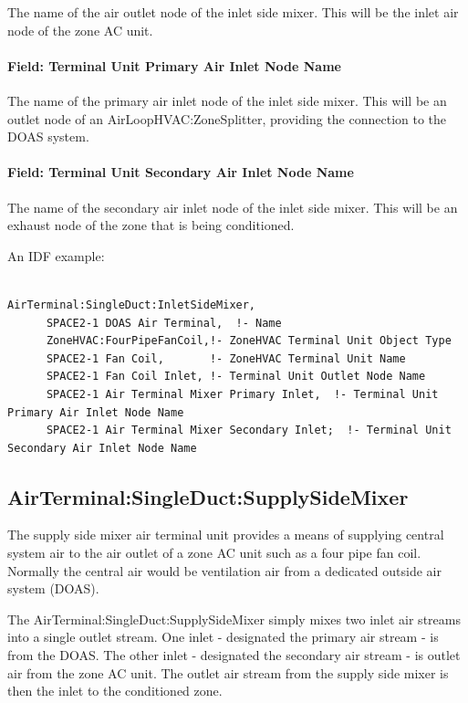 The name of the air outlet node of the inlet side mixer. This will be the inlet air node of the zone AC unit.

\paragraph{Field: Terminal Unit Primary Air Inlet Node Name}\label{field-terminal-unit-primary-air-inlet-node-name}

The name of the primary air inlet node of the inlet side mixer. This will be an outlet node of an AirLoopHVAC:ZoneSplitter, providing the connection to the DOAS system.

\paragraph{Field: Terminal Unit Secondary Air Inlet Node Name}\label{field-terminal-unit-secondary-air-inlet-node-name}

The name of the secondary air inlet node of the inlet side mixer. This will be an exhaust node of the zone that is being conditioned.

An IDF example:

\begin{lstlisting}

AirTerminal:SingleDuct:InletSideMixer,
      SPACE2-1 DOAS Air Terminal,  !- Name
      ZoneHVAC:FourPipeFanCoil,!- ZoneHVAC Terminal Unit Object Type
      SPACE2-1 Fan Coil,       !- ZoneHVAC Terminal Unit Name
      SPACE2-1 Fan Coil Inlet, !- Terminal Unit Outlet Node Name
      SPACE2-1 Air Terminal Mixer Primary Inlet,  !- Terminal Unit Primary Air Inlet Node Name
      SPACE2-1 Air Terminal Mixer Secondary Inlet;  !- Terminal Unit Secondary Air Inlet Node Name
\end{lstlisting}

\subsection{AirTerminal:SingleDuct:SupplySideMixer}\label{airterminalsingleductsupplysidemixer}

The supply side mixer air terminal unit provides a means of supplying central system air to the air outlet of a zone AC unit such as a four pipe fan coil. Normally the central air would be ventilation air from a dedicated outside air system (DOAS).

The AirTerminal:SingleDuct:SupplySideMixer simply mixes two inlet air streams into a single outlet stream. One inlet - designated the primary air stream - is from the DOAS. The other inlet - designated the secondary air stream - is outlet air from the zone AC unit. The outlet air stream from the supply side mixer is then the inlet to the conditioned zone.

